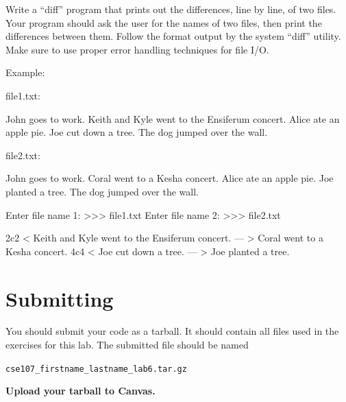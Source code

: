 \documentclass[11pt]{cselabheader}
\begin{document}
  \begin{ex}[diff.py]
    Write a ``diff'' program that prints out the differences, line by line, of
    two files.  Your program should ask the user for the names of two files,
    then print the differences between them.  Follow the format output by the
    system ``diff'' utility.  Make sure to use proper error handling techniques
    for file I/O.

    Example:

    file1.txt:

    \begin{verbatimcode}
John goes to work.
Keith and Kyle went to the Ensiferum concert.
Alice ate an apple pie.
Joe cut down a tree.
The dog jumped over the wall.
    \end{verbatimcode}

    file2.txt:

    \begin{verbatimcode}
John goes to work.
Coral went to a Kesha concert.
Alice ate an apple pie.
Joe planted a tree.
The dog jumped over the wall.
    \end{verbatimcode}

    \begin{verbatimcode}
Enter file name 1: >>> file1.txt
Enter file name 2: >>> file2.txt

2c2
< Keith and Kyle went to the Ensiferum concert.
---
> Coral went to a Kesha concert.
4c4
< Joe cut down a tree.
---
> Joe planted a tree.
    \end{verbatimcode}
  \end{ex}


\pagebreak
\section{Submitting}

You should submit your code as a tarball. It should contain all files
used in the exercises for this lab. The submitted file should be named
\begin{center}
  \texttt{cse107\_firstname\_lastname\_lab6.tar.gz}
\end{center}

\begin{center}
  \textbf{Upload your tarball to Canvas.}
\end{center}

\listoftheorems
\end{document}
